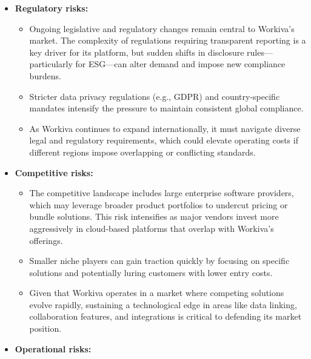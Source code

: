 \documentclass[
  10pt,
  a4paper,
]{article}
\providecommand{\tightlist}{%
  \setlength{\itemsep}{0pt}\setlength{\parskip}{0pt}}\usepackage{longtable,booktabs,array}
\begin{document}
\begin{itemize}
\tightlist
\item
  \textbf{Regulatory risks:}

  \begin{itemize}
  \tightlist
  \item
    Ongoing legislative and regulatory changes remain central to
    Workiva's market. The complexity of regulations requiring
    transparent reporting is a key driver for its platform, but sudden
    shifts in disclosure rules---particularly for ESG---can alter demand
    and impose new compliance burdens.
  \item
    Stricter data privacy regulations (e.g., GDPR) and country-specific
    mandates intensify the pressure to maintain consistent global
    compliance.
  \item
    As Workiva continues to expand internationally, it must navigate
    diverse legal and regulatory requirements, which could elevate
    operating costs if different regions impose overlapping or
    conflicting standards.
  \end{itemize}
\item
  \textbf{Competitive risks:}

  \begin{itemize}
  \tightlist
  \item
    The competitive landscape includes large enterprise software
    providers, which may leverage broader product portfolios to undercut
    pricing or bundle solutions. This risk intensifies as major vendors
    invest more aggressively in cloud-based platforms that overlap with
    Workiva's offerings.
  \item
    Smaller niche players can gain traction quickly by focusing on
    specific solutions and potentially luring customers with lower entry
    costs.
  \item
    Given that Workiva operates in a market where competing solutions
    evolve rapidly, sustaining a technological edge in areas like data
    linking, collaboration features, and integrations is critical to
    defending its market position.
  \end{itemize}
\item
  \textbf{Operational risks:}


\end{itemize}
\end{document}
